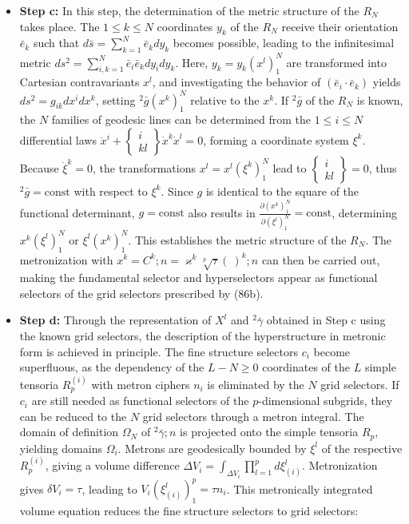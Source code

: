 \documentclass[12pt]{article}
\begin{document}
\begin{itemize}
\begin{itemize}
        \item \textbf{Step c:} In this step, the determination of the metric structure of the \( R_N \) takes place. The \( 1 \le k \le N \) coordinates \( y_k \) of the \( R_N \) receive their orientation \( \bar{e}_k \) such that \( d\bar{s} = \sum_{k=1}^N \bar{e}_k dy_k \) becomes possible, leading to the infinitesimal metric \( ds^2 = \sum_{i,k=1}^N \bar{e}_i \bar{e}_k dy_i dy_k \). Here, \( y_k = y_k(x^l)_1^N \) are transformed into Cartesian contravariants \( x^l \), and investigating the behavior of \( (\bar{e}_i \cdot \bar{e}_k) \) yields \( ds^2 = g_{ik} dx^i dx^k \), setting \( {}^2\bar{g}(x^k)_1^N \) relative to the \( x^k \). If \( {}^2\bar{g} \) of the \( R_N \) is known, the \( N \) families of geodesic lines can be determined from the \( 1 \le i \le N \) differential laws \( \ddot{x}^i + \left\{\begin{matrix} i \\ k l \end{matrix}\right\} \dot{x}^k \dot{x}^l = 0 \), forming a coordinate system \( \xi^k \). Because \(\ddot{\xi}^k = 0\), the transformations \( x^l = x^l(\xi^k)_1^N \) lead to \( \left\{\begin{matrix} i \\ k l \end{matrix}\right\} = 0 \), thus \({}^2\bar{g} = \text{const}\) with respect to \( \xi^k \). Since \( g \) is identical to the square of the functional determinant, \( g = \text{const} \) also results in \( \frac{\partial(x^k)_1^N}{\partial(\xi^l)_1^N} = \text{const} \), determining \( x^k(\xi^l)_1^N \) or \( \xi^l(x^k)_1^N \). This establishes the metric structure of the \( R_N \). The metronization with \( x^k = C^k ; n = \varkappa^k \sqrt[p]{\tau} (\ )^k ; n \) can then be carried out, making the fundamental selector and hyperselectors appear as functional selectors of the grid selectors prescribed by (86b).
        \item \textbf{Step d:} Through the representation of \( X^l \) and \( {}^2\bar{\gamma} \) obtained in Step c using the known grid selectors, the description of the hyperstructure in metronic form is achieved in principle. The fine structure selectors \( c_i \) become superfluous, as the dependency of the \( L - N \ge 0 \) coordinates of the \( L \) simple tensoria \( R_p^{(i)} \) with metron ciphers \( n_i \) is eliminated by the \( N \) grid selectors. If \( c_i \) are still needed as functional selectors of the \( p \)-dimensional subgrids, they can be reduced to the \( N \) grid selectors through a metron integral. The domain of definition \(\Omega_N\) of \({}^2\bar{\gamma} ; n\) is projected onto the simple tensoria \(R_p\), yielding domains \(\Omega_i\). Metrons are geodesically bounded by \(\xi^l\) of the respective \(R_p^{(i)}\), giving a volume difference \(\Delta V_i = \int_{\Delta V_i} \prod_{l=1}^p d\xi_{(i)}^l\). Metronization gives \(\delta V_i = \tau\), leading to \(V_i(\xi_{(i)}^l)_1^p = \tau n_i\). This metronically integrated volume equation reduces the fine structure selectors to grid selectors:

\end{itemize}
\end{itemize}
\end{document}
